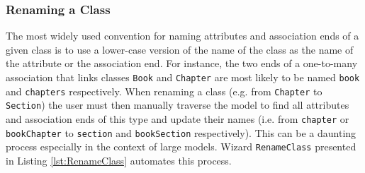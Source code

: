 \subsubsection{Renaming a Class}
\label{sec:RenameClass}

The most widely used convention for naming attributes and association ends of a given class is to use a lower-case version of the name of the class as the name of the attribute or the association end. For instance, the two ends of a one-to-many association that links classes \texttt{Book} and \texttt{Chapter} are most likely to be named \texttt{book} and \texttt{chapters} respectively. When renaming a class (e.g. from \texttt{Chapter} to \texttt{Section}) the user must then manually traverse the model to find all attributes and association ends of this type and update their names (i.e. from \texttt{chapter} or \texttt{bookChapter} to \texttt{section} and \texttt{bookSection} respectively). This can be a daunting process especially in the context of large models. Wizard \texttt{RenameClass} presented in Listing \ref{lst:RenameClass} automates this process.

